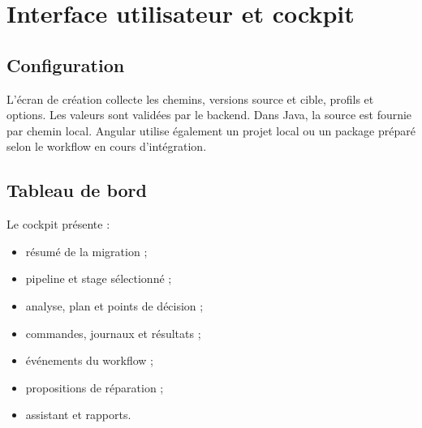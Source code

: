 \section{Interface utilisateur et cockpit}

\subsection{Configuration}

L'écran de création collecte les chemins, versions source et cible, profils et options. Les valeurs sont validées par le backend. Dans Java, la source est fournie par chemin local. Angular utilise également un projet local ou un package préparé selon le workflow en cours d'intégration.

\subsection{Tableau de bord}

Le cockpit présente :

\begin{itemize}
    \item résumé de la migration ;
    \item pipeline et stage sélectionné ;
    \item analyse, plan et points de décision ;
    \item commandes, journaux et résultats ;
    \item événements du workflow ;
    \item propositions de réparation ;
    \item assistant et rapports.
\end{itemize}

